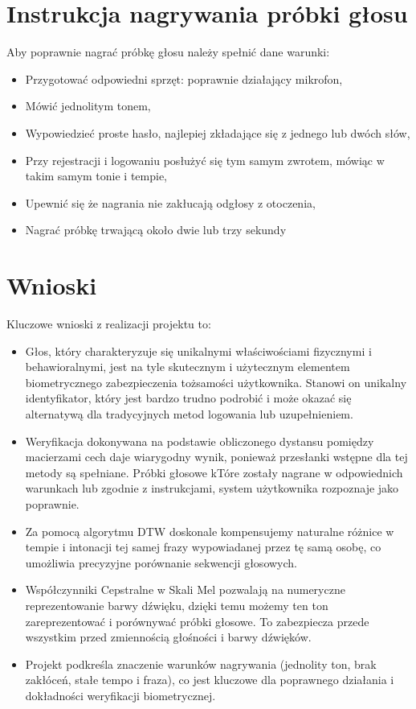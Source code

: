 \section{Instrukcja nagrywania próbki głosu}
Aby poprawnie nagrać próbkę głosu należy spełnić dane warunki:
\begin{itemize}
	\item Przygotować odpowiedni sprzęt: poprawnie działający mikrofon,
	\item Mówić jednolitym tonem, 
	\item Wypowiedzieć proste hasło, najlepiej zkładające się z jednego lub dwóch słów,
	\item Przy rejestracji i logowaniu posłużyć się tym samym zwrotem, mówiąc w takim samym tonie i tempie,
	\item Upewnić się że nagrania nie zakłucają odgłosy z otoczenia,
	\item Nagrać próbkę trwającą około dwie lub trzy sekundy
	
\end{itemize}


\section{Wnioski}
Kluczowe wnioski z realizacji projektu to:
\begin{itemize}
	\item Głos, który charakteryzuje się unikalnymi właściwościami fizycznymi i behawioralnymi, jest na tyle skutecznym i użytecznym elementem biometrycznego zabezpieczenia tożsamości użytkownika. Stanowi on unikalny identyfikator, który jest bardzo trudno podrobić i może okazać się alternatywą dla tradycyjnych metod logowania lub uzupełnieniem.
	\item Weryfikacja dokonywana na podstawie obliczonego dystansu pomiędzy macierzami cech daje wiarygodny wynik, ponieważ przesłanki wstępne dla tej metody są spełniane. Próbki głosowe kTóre zostały nagrane w odpowiednich warunkach lub zgodnie z instrukcjami, system użytkownika rozpoznaje jako poprawnie.
	\item Za pomocą algorytmu DTW doskonale kompensujemy naturalne różnice w tempie i intonacji tej samej frazy wypowiadanej przez tę samą osobę, co umożliwia precyzyjne porównanie sekwencji głosowych. 
	\item Współczynniki Cepstralne w Skali Mel pozwalają na numeryczne reprezentowanie barwy dźwięku, dzięki temu możemy ten ton zareprezentować i porównywać próbki głosowe. To zabezpiecza przede wszystkim przed zmiennością głośności i barwy dźwięków.
	\item Projekt podkreśla znaczenie warunków nagrywania (jednolity ton, brak zakłóceń, stałe tempo i fraza), co jest kluczowe dla poprawnego działania i dokładności weryfikacji biometrycznej.
\end{itemize}


